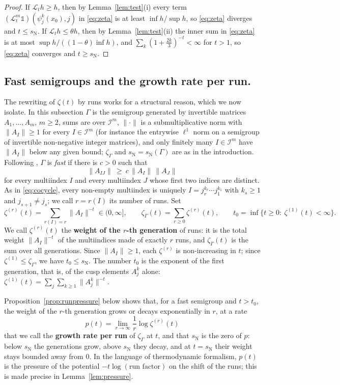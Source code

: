 \documentclass[11pt]{amsart}
\theoremstyle{definition}
\theoremstyle{remark}
\newcommand{\cI}{\mathcal I}
\newcommand{\cL}{\mathcal L}
\newcommand{\sN}{s_{\mathrm N}}
\newcommand{\norm}[1]{\lVert #1\rVert}
\begin{document}
\begin{proof}
If $\cL_th\ge h$, then by Lemma~\ref{lem:test}(i) every term
$(\cL_t^m\mathds 1)(\psi_j^k(x_0),j)$ in \eqref{eq:zeta} is at least $\inf h/\sup h$, so
\eqref{eq:zeta} diverges and $t\le\sN$. If $\cL_th\le\theta h$, then by
Lemma~\ref{lem:test}(ii) the inner sum in \eqref{eq:zeta} is at most
$\sup h/((1-\theta)\inf h)$, and $\sum_k(1+\frac{2k}3)^{-t}<\infty$ for $t>1$, so
\eqref{eq:zeta} converges and $t\ge\sN$.
\end{proof}

\subsection*{Fast semigroups and the growth rate per run.}
The rewriting of $\zeta(t)$ by runs works for a structural reason, which we now
isolate. In this subsection $\Gamma$ is the semigroup generated by invertible matrices $A_1,\dots,A_m$,
$m\ge2$, sums are over $\cI^m$, $\norm{\cdot}$ is a submultiplicative norm with
$\norm{A_I}\ge1$ for every $I\in\cI^m$ (for instance the entrywise $\ell^1$ norm on a semigroup of
invertible non-negative integer matrices), and only finitely many $I\in\cI^m$ have $\norm{A_I}$ below any given bound; $\zeta_\Gamma$ and $\sN=\sN(\Gamma)$ are as in the introduction. Following \cite[Def.~3]{DL15JGA}, $\Gamma$ is \emph{fast} if there is $c>0$
such that
\[
  \norm{A_{IJ}}\ \ge\ c\,\norm{A_I}\,\norm{A_J}
\]
for every multiindex $I$ and every multiindex $J$ whose first two indices are distinct.
As in \eqref{eq:cocycle}, every non-empty multiindex is uniquely $I=j_r^{k_r}\cdots j_1^{k_1}$ with $k_s\ge1$ and
$j_{s+1}\neq j_s$; we call $r=r(I)$ its number of runs. Set
\[
  \zeta^{(r)}(t)=\sum_{r(I)=r}\norm{A_I}^{-t}\in(0,\infty],\qquad
  \zeta_\Gamma(t)=\sum_{r\ge0}\zeta^{(r)}(t),\qquad
  t_0=\inf\{t\ge0:\ \zeta^{(1)}(t)<\infty\}.
\]
We call $\zeta^{(r)}(t)$ the \textbf{weight of the $r$-th generation} of runs: it is the total weight $\norm{A_I}^{-t}$ of the multiindices made of exactly $r$ runs, and $\zeta_\Gamma(t)$ is the sum over all generations. Since $\norm{A_I}\ge1$, each $\zeta^{(r)}$ is non-increasing in $t$; since
$\zeta^{(1)}\le\zeta_\Gamma$, we have $t_0\le\sN$. The number $t_0$ is the exponent of the first generation, that is, of the cusp elements $A_j^k$ alone: $\zeta^{(1)}(t)=\sum_j\sum_{k\ge1}\norm{A_j^k}^{-t}$.

Proposition~\ref{prop:runpressure} below shows that, for a fast semigroup and $t>t_0$, the weight of the $r$-th generation grows or decays exponentially in $r$, at a rate
\[
  p(t)=\lim_{r\to\infty}\frac1r\log\zeta^{(r)}(t)
\]
that we call the \textbf{growth rate per run} of $\zeta_\Gamma$ at $t$, and that $\sN$ is the zero of $p$: below $\sN$ the generations grow, above $\sN$ they decay, and at $t=\sN$ their weight stays bounded away from $0$. In the language of thermodynamic formalism, $p(t)$ is the pressure of the potential $-t\log(\text{run factor})$ on the shift of the runs; this is made precise in Lemma~\ref{lem:pressure}.
\end{document}
